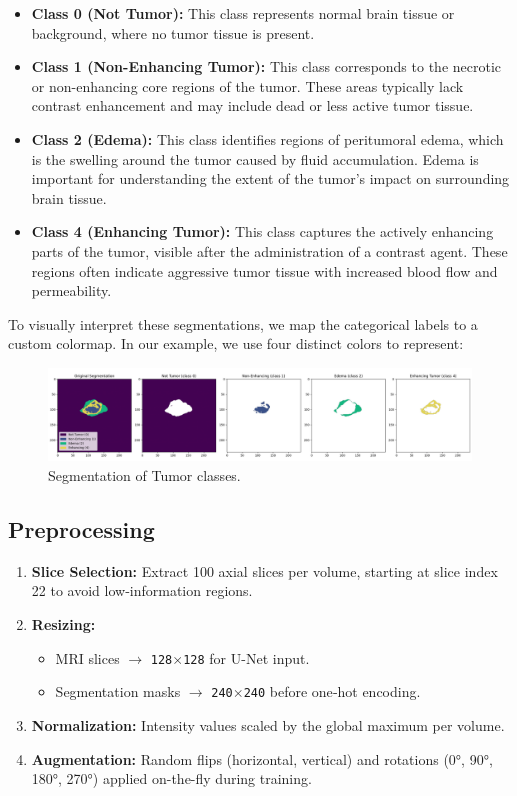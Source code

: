 \begin{itemize}
  \item \textbf{Class 0 (Not Tumor):} This class represents normal brain tissue or background, where no tumor tissue is present.
  \item \textbf{Class 1 (Non-Enhancing Tumor):} This class corresponds to the necrotic or non-enhancing core regions of the tumor. These areas typically lack contrast enhancement and may include dead or less active tumor tissue.
  \item \textbf{Class 2 (Edema):} This class identifies regions of peritumoral edema, which is the swelling around the tumor caused by fluid accumulation. Edema is important for understanding the extent of the tumor’s impact on surrounding brain tissue.
  \item \textbf{Class 4 (Enhancing Tumor):} This class captures the actively enhancing parts of the tumor, visible after the administration of a contrast agent. These regions often indicate aggressive tumor tissue with increased blood flow and permeability.
\end{itemize}

To visually interpret these segmentations, we map the categorical labels to a custom colormap. In our example, we use four distinct colors to represent:

\begin{figure}[H]
  \centering
  \includegraphics[width=1.1\textwidth]{Images/Chapter3/tclass.png}
  \caption{Segmentation of Tumor classes.}
  \label{fig:tclass}
\end{figure}

\subsection{Preprocessing}
\begin{enumerate}
  \item \textbf{Slice Selection:} Extract 100 axial slices per volume, starting at slice index 22 to avoid low‐information regions.
  \item \textbf{Resizing:}
        \begin{itemize}
          \item MRI slices $\to$ \texttt{128$\times$128} for U-Net input.
          \item Segmentation masks $\to$ \texttt{240$\times$240} before one‐hot encoding.
        \end{itemize}
  \item \textbf{Normalization:} Intensity values scaled by the global maximum per volume.
  \item \textbf{Augmentation:} Random flips (horizontal, vertical) and rotations (0°, 90°, 180°, 270°) applied on-the-fly during training.
\end{enumerate}

